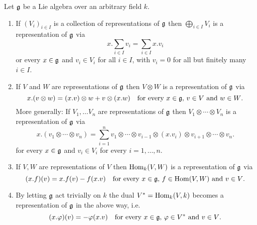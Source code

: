 \begin{prop}\label{prop: new representations from old ones}
 Let $\mathfrak{g}$ be a Lie algebra over an arbitrary field $k$.
 \begin{enumerate}[leftmargin=*]
  \item
   If $(V_i)_{i \in I}$ is a collection of representations of $\mathfrak{g}$ then $\bigoplus_{i \in I} V_i$ is a representation of $\mathfrak{g}$ via
   \[
    x.\sum_{i \in I} v_i = \sum_{i \in I} x.v_i
   \]
   or every $x \in \mathfrak{g}$ and $v_i \in V_i$ for all $i \in I$, with $v_i = 0$ for all but finitely many $i \in I$.
  \item
   If $V$ and $W$ are representations of $\mathfrak{g}$ then $V \otimes W$ is a representation of $\mathfrak{g}$ via
   \[
    x.(v \otimes w) = (x.v) \otimes w + v \otimes (x.w) \quad \text{for every $x \in \mathfrak{g}$, $v \in V$ and $w \in W$}.
   \]
   More generally: If $V_1, \dotsc V_n$ are representations of $\mathfrak{g}$ then $V_1 \otimes \dotsb \otimes V_n$ is a representation of $\mathfrak{g}$ via
   \[
    x.(v_1 \otimes \dotsb \otimes v_n)
    = \sum_{i=1}^n v_1 \otimes \dotsb \otimes v_{i-1} \otimes (x.v_i) \otimes v_{i+1} \otimes \dotsb \otimes v_n.
   \]
   for every $x \in \mathfrak{g}$ and $v_i \in V_i$ for every $i = 1, \dotsc, n$.
  \item
   If $V, W$ are representations of $V$ then $\operatorname{Hom}_k(V,W)$ is a representation of $\mathfrak{g}$ via
   \[
    (x.f)(v) = x.f(v) - f(x.v) \quad \text{for every $x \in \mathfrak{g}$, $f \in \operatorname{Hom}(V,W)$ and $v \in V$}.
   \]
  \item
   By letting $\mathfrak{g}$ act trivially on $k$ the dual $V^* = \operatorname{Hom}_k(V,k)$ becomes a representation of $\mathfrak{g}$ in the above way, i.e.
   \[
    (x.\varphi)(v) = -\varphi(x.v) \quad \text{for every $x \in \mathfrak{g}$, $\varphi \in V^*$ and $v \in V$}.
   \]
 \end{enumerate}
\end{prop}
